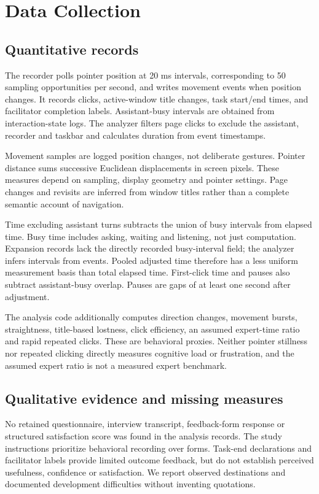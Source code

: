 \documentclass[11pt,a4paper]{article}
\begin{document}
\section{Data Collection}
\subsection{Quantitative records}
The recorder polls pointer position at 20 ms intervals, corresponding to 50 sampling opportunities per second, and writes movement events when position changes. It records clicks, active-window title changes, task start/end times, and facilitator completion labels. Assistant-busy intervals are obtained from interaction-state logs. The analyzer filters page clicks to exclude the assistant, recorder and taskbar and calculates duration from event timestamps.

Movement samples are logged position changes, not deliberate gestures. Pointer distance sums successive Euclidean displacements in screen pixels. These measures depend on sampling, display geometry and pointer settings. Page changes and revisits are inferred from window titles rather than a complete semantic account of navigation.

Time excluding assistant turns subtracts the union of busy intervals from elapsed time. Busy time includes asking, waiting and listening, not just computation. Expansion records lack the directly recorded busy-interval field; the analyzer infers intervals from events. Pooled adjusted time therefore has a less uniform measurement basis than total elapsed time. First-click time and pauses also subtract assistant-busy overlap. Pauses are gaps of at least one second after adjustment.

The analysis code additionally computes direction changes, movement bursts, straightness, title-based lostness, click efficiency, an assumed expert-time ratio and rapid repeated clicks. These are behavioral proxies. Neither pointer stillness nor repeated clicking directly measures cognitive load or frustration, and the assumed expert ratio is not a measured expert benchmark.

\subsection{Qualitative evidence and missing measures}
No retained questionnaire, interview transcript, feedback-form response or structured satisfaction score was found in the analysis records. The study instructions prioritize behavioral recording over forms. Task-end declarations and facilitator labels provide limited outcome feedback, but do not establish perceived usefulness, confidence or satisfaction. We report observed destinations and documented development difficulties without inventing quotations.
\end{document}
